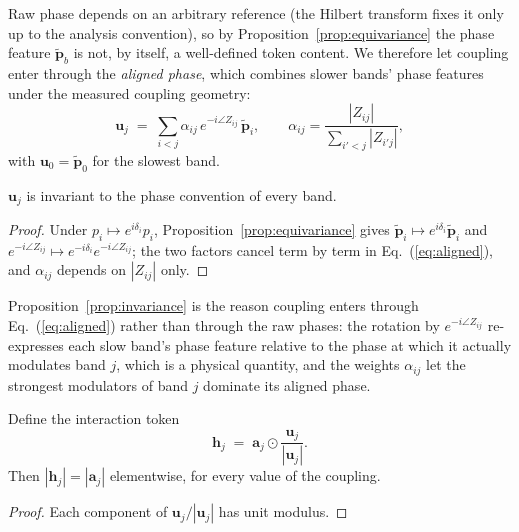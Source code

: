 Raw phase depends on an arbitrary reference (the Hilbert transform fixes
it only up to the analysis convention), so by
Proposition~\ref{prop:equivariance} the phase feature
$\tilde{\mathbf{p}}_b$ is not, by itself, a well-defined token content.
We therefore let coupling enter through the \emph{aligned phase}, which
combines slower bands' phase features under the measured coupling geometry:
\begin{equation}
\mathbf{u}_j \;=\; \sum_{i<j} \alpha_{ij}\, e^{-i \angle Z_{ij}}\,
\tilde{\mathbf{p}}_i,
\qquad
\alpha_{ij} = \frac{|Z_{ij}|}{\sum_{i'<j}|Z_{i'j}|},
\label{eq:aligned}
\end{equation}
with $\mathbf{u}_0 = \tilde{\mathbf{p}}_0$ for the slowest band.

\begin{proposition}
\label{prop:invariance}
$\mathbf{u}_j$ is invariant to the phase convention of every band.
\end{proposition}
\begin{proof}
Under $p_i \mapsto e^{i\delta_i} p_i$, Proposition~\ref{prop:equivariance}
gives $\tilde{\mathbf{p}}_i \mapsto e^{i\delta_i}\tilde{\mathbf{p}}_i$ and
$e^{-i\angle Z_{ij}} \mapsto e^{-i\delta_i}e^{-i\angle Z_{ij}}$; the two
factors cancel term by term in Eq.~(\ref{eq:aligned}), and $\alpha_{ij}$
depends on $|Z_{ij}|$ only.
\end{proof}

Proposition~\ref{prop:invariance} is the reason coupling enters through
Eq.~(\ref{eq:aligned}) rather than through the raw phases: the rotation by
$e^{-i\angle Z_{ij}}$ re-expresses each slow band's phase feature relative
to the phase at which it actually modulates band $j$, which is a physical
quantity, and the weights $\alpha_{ij}$ let the strongest modulators of
band $j$ dominate its aligned phase.

\begin{proposition}
\label{prop:isometry}
Define the interaction token
\begin{equation}
\mathbf{h}_j \;=\; \mathbf{a}_j \odot
\frac{\mathbf{u}_j}{|\mathbf{u}_j|} .
\label{eq:rotation}
\end{equation}
Then $|\mathbf{h}_j| = |\mathbf{a}_j|$ elementwise, for every value of the
coupling.
\end{proposition}
\begin{proof}
Each component of $\mathbf{u}_j/|\mathbf{u}_j|$ has unit modulus.
\end{proof}

